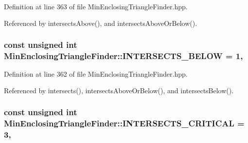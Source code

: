 Definition at line 363 of file Min\-Enclosing\-Triangle\-Finder.\-hpp.



Referenced by intersects\-Above(), and intersects\-Above\-Or\-Below().

\hypertarget{classmultiscale_1_1MinEnclosingTriangleFinder_ab3251c940d6ca18e9339d1d168390ab6}{
\subsubsection[{I\-N\-T\-E\-R\-S\-E\-C\-T\-S\-\_\-\-B\-E\-L\-O\-W}]{\setlength{\rightskip}{0pt plus 5cm}const unsigned int Min\-Enclosing\-Triangle\-Finder\-::\-I\-N\-T\-E\-R\-S\-E\-C\-T\-S\-\_\-\-B\-E\-L\-O\-W = 1\hspace{0.3cm}{\ttfamily [static]}, {\ttfamily [private]}}}\label{classmultiscale_1_1MinEnclosingTriangleFinder_ab3251c940d6ca18e9339d1d168390ab6}


Definition at line 362 of file Min\-Enclosing\-Triangle\-Finder.\-hpp.



Referenced by intersects(), intersects\-Above\-Or\-Below(), and intersects\-Below().

\hypertarget{classmultiscale_1_1MinEnclosingTriangleFinder_a55ae42aad114fcd3d1b17ae181e3cdfb}{
\subsubsection[{I\-N\-T\-E\-R\-S\-E\-C\-T\-S\-\_\-\-C\-R\-I\-T\-I\-C\-A\-L}]{\setlength{\rightskip}{0pt plus 5cm}const unsigned int Min\-Enclosing\-Triangle\-Finder\-::\-I\-N\-T\-E\-R\-S\-E\-C\-T\-S\-\_\-\-C\-R\-I\-T\-I\-C\-A\-L = 3\hspace{0.3cm}{\ttfamily [static]}, {\ttfamily [private]}}}\label{classmultiscale_1_1MinEnclosingTriangleFinder_a55ae42aad114fcd3d1b17ae181e3cdfb}


